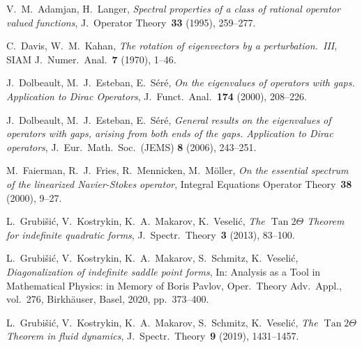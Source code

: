 \documentclass[11pt,a4paper]{amsart}
\numberwithin{equation}{section}
\DeclareMathOperator{\Tan}{Tan}
\theoremstyle{plain}
\theoremstyle{definition}
\theoremstyle{remark}
\begin{document}
\begin{thebibliography}{[10]}

   V.~M.~Adamjan, H.~Langer,
    \emph{Spectral properties of a class of rational operator valued functions},
    J.~Operator Theory~\textbf{33} (1995), 259--277.

   C.~Davis, W.~M.~Kahan,
    \emph{The rotation of eigenvectors by a perturbation.~III},
    SIAM J.~Numer.~Anal.~\textbf{7} (1970), 1--46.  

   J.~Dolbeault, M.~J.~Esteban, E.~S\'er\'e,
    \emph{On the eigenvalues of operators with gaps. Application to Dirac Operators},
    J.~Funct.~Anal.~\textbf{174} (2000), 208--226.

   J.~Dolbeault, M.~J.~Esteban, E.~S\'er\'e,
    \emph{General results on the eigenvalues of operators with gaps, arising from both ends of the gaps. Application to Dirac
      operators},
    J.~Eur.~Math.~Soc.~(JEMS) \textbf{8} (2006), 243--251.

   M.~Faierman, R.~J.~Fries, R.~Mennicken, M.~M\"oller,
    \emph{On the essential spectrum of the linearized Navier-Stokes operator},
    Integral Equations Operator Theory~\textbf{38} (2000), 9--27.

   L.~Grubi\v{s}i\'c, V.~Kostrykin, K.~A.~Makarov, K.~Veseli\'c,
    \emph{The $\Tan 2\Theta$ Theorem for indefinite quadratic forms},
    J.~Spectr.~Theory~\textbf{3} (2013), 83--100.

   L.~Grubi\v{s}i\'c, V.~Kostrykin, K.~A.~Makarov, S.~Schmitz, K.~Veseli\'c,
    \emph{Diagonalization of indefinite saddle point forms},
    In: Analysis as a Tool in Mathematical Physics: in Memory of Boris Pavlov,
    Oper.~Theory Adv.~Appl., vol.~276, Birkh\"auser, Basel, 2020, pp.~373--400.

   L.~Grubi\v{s}i\'c, V.~Kostrykin, K.~A.~Makarov, S.~Schmitz, K.~Veseli\'c,
    \emph{The $\Tan2\Theta$ Theorem in fluid dynamics},
    J.~Spectr.~Theory~\textbf{9} (2019), 1431--1457.


\end{thebibliography}
\end{document}
